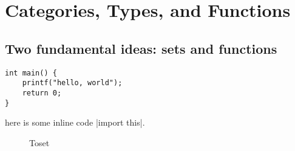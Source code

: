 \documentclass[12pt]{article}
\theoremstyle{definition}
\begin{document}

\tableofcontents
\pagebreak
\listoffigures
\listoftables

\section{Categories, Types, and Functions}
\subsection{Two fundamental ideas: sets and functions}

\begin{verbatim}
int main() {
    printf("hello, world");
    return 0;
}
\end{verbatim}

here is some inline code |import this|.


\begin{figure}[H]
	\begin{center}
		
	\end{center}
	\caption{Toset}
\end{figure}

\printindex
\end{document}
